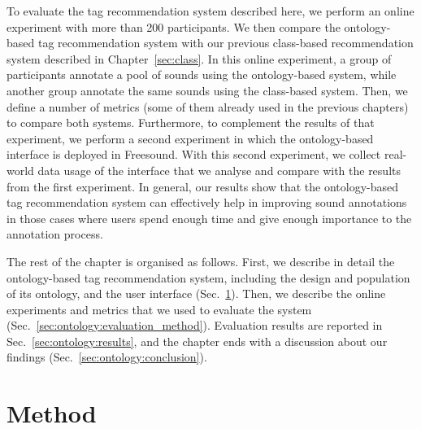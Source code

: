 To evaluate the tag recommendation system described here, we perform an online experiment with more than 200 participants. We then compare the ontology-based tag recommendation system with our previous class-based recommendation system described in Chapter~\ref{sec:class}. In this online experiment, a group of participants annotate a pool of sounds using the ontology-based system, while another group annotate the same sounds using the class-based system. Then, we define a number of metrics (some of them already used in the previous chapters) to compare both systems. Furthermore, to complement the results of that experiment, we perform a second experiment in which the ontology-based interface is deployed in Freesound. With this second experiment, we collect real-world data usage of the interface that we analyse and compare with the results from the first experiment. In general, our results show that the ontology-based tag recommendation system can effectively help in improving sound annotations in those cases where users spend enough time and give enough importance to the annotation process.

The rest of the chapter is organised as follows. First, we describe in detail the ontology-based tag recommendation system, including the design and population of its ontology, and the user interface (Sec.~\ref{sec:ontology:method}). Then, we describe the online experiments and metrics that we used to evaluate the system (Sec.~\ref{sec:ontology:evaluation_method}). Evaluation results are reported in Sec.~\ref{sec:ontology:results}, and the chapter ends with a discussion about our findings  (Sec.~\ref{sec:ontology:conclusion}).


\section{Method}
\label{sec:ontology:method}
